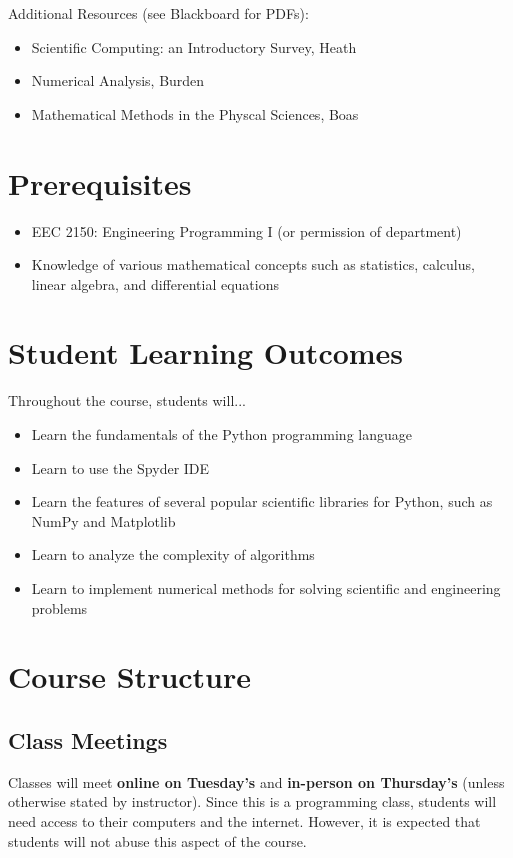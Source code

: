\documentclass[11pt]{article}
\begin{document}
Additional Resources (see Blackboard for PDFs):
\begin{itemize}
	\setlength\itemsep{-2pt}
	\item Scientific Computing: an Introductory Survey, Heath
	\item Numerical Analysis, Burden
	\item Mathematical Methods in the Physcal Sciences, Boas
\end{itemize}


\section{Prerequisites}
\begin{itemize}
	\item EEC 2150: Engineering Programming I (or permission of department)
	\item Knowledge of various mathematical concepts such as statistics, calculus, linear algebra, and differential equations
\end{itemize}


\section{Student Learning Outcomes}
Throughout the course, students will...
\begin{itemize}
	\setlength\itemsep{-2pt}
	\item Learn the fundamentals of the Python programming language
	\item Learn to use the Spyder IDE
	\item Learn the features of several popular scientific libraries for Python, such as NumPy and Matplotlib
	\item Learn to analyze the complexity of algorithms
	\item Learn to implement numerical methods for solving scientific and engineering problems
\end{itemize}


\section{Course Structure}

\subsection*{Class Meetings}
Classes will meet \textbf{online on Tuesday's} and \textbf{in-person on Thursday's} (unless otherwise stated by instructor). Since this is a programming class, students will need access to their computers and the internet. However, it is expected that students will not abuse this aspect of the course.
\end{document}
